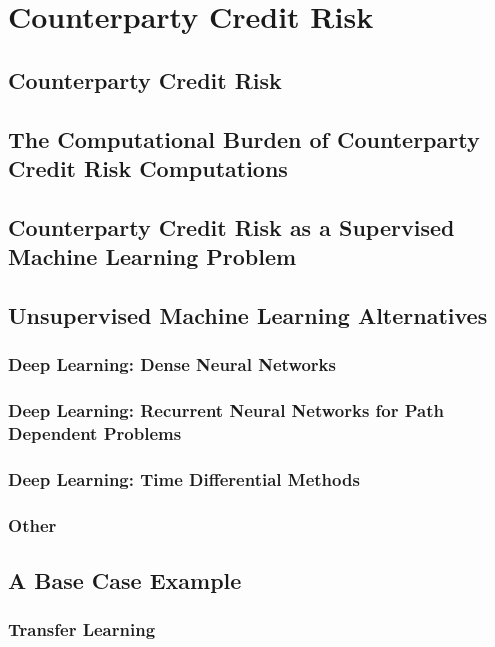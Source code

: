 \chapter{Counterparty Credit Risk}
\label{chap:MarketRisk}

\section{Counterparty Credit Risk}

\section{The Computational Burden of Counterparty Credit Risk Computations}

\section{Counterparty Credit Risk as a Supervised Machine Learning Problem}


\section{Unsupervised Machine Learning Alternatives}
\subsection{Deep Learning: Dense Neural Networks}
\subsection{Deep Learning: Recurrent Neural Networks for Path Dependent Problems}
\subsection{Deep Learning: Time Differential Methods}
\subsection{Other}
\section{A Base Case Example}
\subsection{Transfer Learning}
